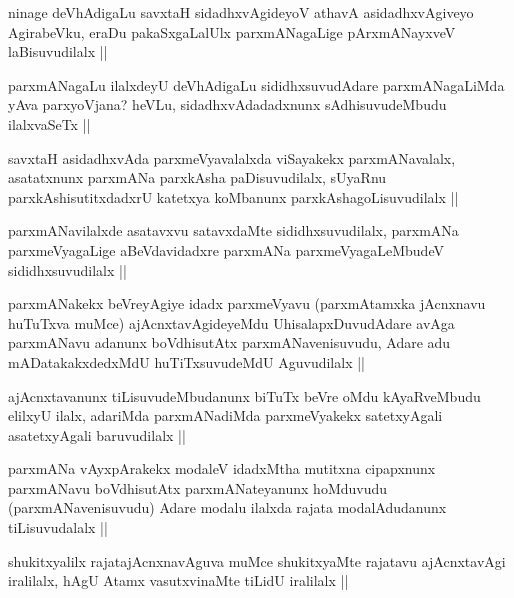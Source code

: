 \begin{artha}
ninage deVhAdigaLu savxtaH sidadhxvAgideyoV athavA asidadhxvAgiveyo AgirabeVku, eraDu pakaSxgaLalUlx parxmANagaLige pArxmANayxveV laBisuvudilalx ||
\end{artha}

\begin{artha}
parxmANagaLu ilalxdeyU deVhAdigaLu sididhxsuvudAdare parxmANagaLiMda yAva parxyoVjana? heVLu, sidadhxvAdadadxnunx sAdhisuvudeMbudu ilalxvaSeTx ||
\end{artha}

\begin{artha}
savxtaH asidadhxvAda parxmeVyavalalxda viSayakekx parxmANavalalx, asatatxnunx parxmANa parxkAsha paDisuvudilalx, sUyaRnu parxkAshisutitxdadxrU katetxya koMbanunx parxkAshagoLisuvudilalx ||
\end{artha}

\begin{artha}
parxmANavilalxde asatavxvu satavxdaMte sididhxsuvudilalx, parxmANa parxmeVyagaLige aBeVdavidadxre parxmANa parxmeVyagaLeMbudeV sididhxsuvudilalx ||
\end{artha}

\begin{artha}
parxmANakekx beVreyAgiye idadx parxmeVyavu (parxmAtamxka jAcnxnavu huTuTxva muMce) ajAcnxtavAgideyeMdu UhisalapxDuvudAdare avAga parxmANavu adanunx boVdhisutAtx parxmANavenisuvudu, Adare adu mADatakakxdedxMdU huTiTxsuvudeMdU Aguvudilalx ||
\end{artha}

\begin{artha}
ajAcnxtavanunx tiLisuvudeMbudanunx biTuTx beVre oMdu kAyaRveMbudu elilxyU ilalx, adariMda parxmANadiMda parxmeVyakekx satetxyAgali asatetxyAgali baruvudilalx ||
\end{artha}

\begin{artha}
parxmANa vAyxpArakekx modaleV idadxMtha mutitxna cipapxnunx parxmANavu boVdhisutAtx parxmANateyanunx hoMduvudu (parxmANavenisuvudu) Adare modalu ilalxda rajata modalAdudanunx tiLisuvudalalx ||
\end{artha}

\begin{artha}
shukitxyalilx rajatajAcnxnavAguva muMce shukitxyaMte rajatavu ajAcnxtavAgi iralilalx, hAgU Atamx vasutxvinaMte tiLidU iralilalx ||
\end{artha}

